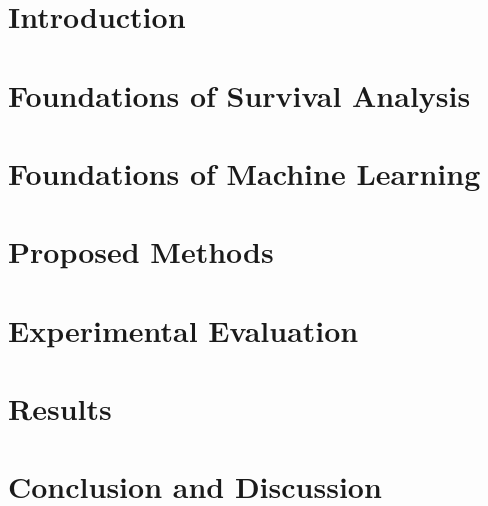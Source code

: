 \documentclass[mestrado, qualificacao]{packages/icmc}
\begin{document}
\textual

\chapter{Introduction}
\label{chapter:introducao}


% 

\chapter{Foundations of Survival Analysis}
\label{chapter:survival-analysis}


\chapter{Foundations of Machine Learning}
\label{chapter:kernel_methods}


\chapter{Proposed Methods}
\label{chapter:proposed_methods}


\chapter{Experimental Evaluation}
\label{chapter:methodology}


\chapter{Results}
\label{chapter:simulation}


\chapter{Conclusion and Discussion}
\label{chapter:conclusion}


%
\end{document}
